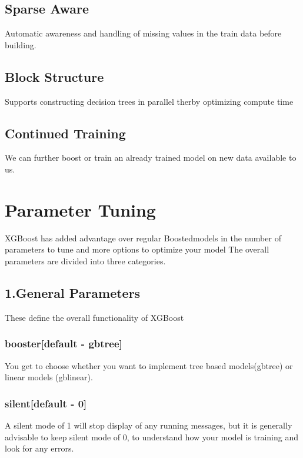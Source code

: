 \subsection{Sparse Aware} 
Automatic awareness and handling of missing values in the train data before building.

\subsection{Block Structure}
Supports constructing decision trees in parallel therby optimizing compute time

\subsection{Continued Training} 
We can further boost or train an already trained model on new data available to us.



\section{Parameter Tuning} 

XGBoost has added advantage over regular Boostedmodels in the number of parameters 
to tune and more options to optimize your model The overall parameters are divided 
into three categories.

\subsection{1.General Parameters}

These define the overall functionality of XGBoost

\subsubsection{booster[default - gbtree]}  

You get to choose whether you want to implement tree based models(gbtree) or linear 
models (gblinear).

\subsubsection{silent[default - 0]}

A silent mode of 1 will stop display of any running messages, but it is generally 
advisable to keep silent mode of 0, to understand how your model is training and 
look for any errors.


